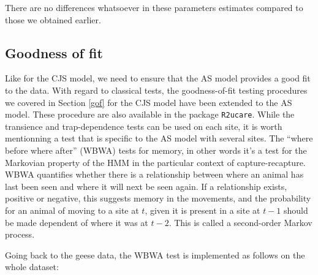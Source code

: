 \documentclass[
  12pt,
]{krantz}
\newenvironment{Shaded}{\begin{snugshade}}{\end{snugshade}}
\newcommand{\CommentTok}[1]{\textcolor[rgb]{0.56,0.35,0.01}{\textit{#1}}}
\newcommand{\DecValTok}[1]{\textcolor[rgb]{0.00,0.00,0.81}{#1}}
\newcommand{\FunctionTok}[1]{\textcolor[rgb]{0.13,0.29,0.53}{\textbf{#1}}}
\newcommand{\NormalTok}[1]{#1}
\newcommand{\OtherTok}[1]{\textcolor[rgb]{0.56,0.35,0.01}{#1}}
\newcommand{\SpecialCharTok}[1]{\textcolor[rgb]{0.81,0.36,0.00}{\textbf{#1}}}
\newcommand{\StringTok}[1]{\textcolor[rgb]{0.31,0.60,0.02}{#1}}
\begin{document}
There are no differences whatsoever in these parameters estimates compared to those we obtained earlier.

\subsection{Goodness of fit}\label{gofas}

Like for the CJS model, we need to ensure that the AS model provides a good fit to the data. With regard to classical tests, the goodness-of-fit testing procedures we covered in Section \ref{gof} for the CJS model have been extended to the AS model. These procedure are also available in the package \texttt{R2ucare}. While the transience and trap-dependence tests can be used on each site, it is worth mentionning a test that is specific to the AS model with several sites. The ``where before where after'' (WBWA) tests for memory, in other words it's a test for the Markovian property of the HMM in the particular context of capture-recapture. WBWA quantifies whether there is a relationship between where an animal has last been seen and where it will next be seen again. If a relationship exists, positive or negative, this suggests memory in the movements, and the probability for an animal of moving to a site at \(t\), given it is present in a site at \(t-1\) should be made dependent of where it was at \(t-2\). This is called a second-order Markov process.

Going back to the geese data, the WBWA test is implemented as follows on the whole dataset:

\begin{Shaded}
\end{Shaded}
\end{document}
